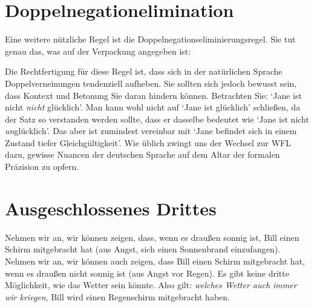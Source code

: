 \section{Doppelnegationelimination}
Eine weitere nützliche Regel ist die Doppelnegationseliminierungsregel. Sie tut genau das, was auf der Verpackung angegeben ist:

Die Rechtfertigung für diese Regel ist, dass sich in der natürlichen Sprache Doppelverneinungen tendenziell aufheben. Sie sollten sich jedoch bewusst sein, dass Kontext und Betonung Sie daran hindern können. Betrachten Sie: `Jane ist nicht \emph{nicht} glücklich'. Man kann wohl nicht auf `Jane ist glücklich' schlie{\ss}en, da der Satz so verstanden werden sollte, dass er dasselbe bedeutet wie `Jane ist nicht \emph{un}glücklich'. Das aber ist zumindest vereinbar mit `Jane befindet sich in einem Zustand tiefer Gleichgültigkeit'. Wie üblich zwingt uns der Wechsel zur WFL dazu, gewisse Nuancen der deutschen Sprache auf dem Altar der formalen Präzision zu opfern.

\section{Ausgeschlossenes Drittes}

Nehmen wir an, wir können zeigen, dass, wenn es drau{\ss}en sonnig ist, Bill einen Schirm mitgebracht hat (aus Angst, sich einen Sonnenbrand einzufangen). Nehmen wir an, wir können auch zeigen, dass Bill einen Schirm mitgebracht hat, wenn es drau{\ss}en nicht sonnig ist (aus Angst vor Regen). Es gibt keine dritte Möglichkeit, wie das Wetter sein könnte. Also gilt: \emph{welches Wetter auch immer wir kriegen}, Bill wird einen Regenschirm mitgebracht haben. 

